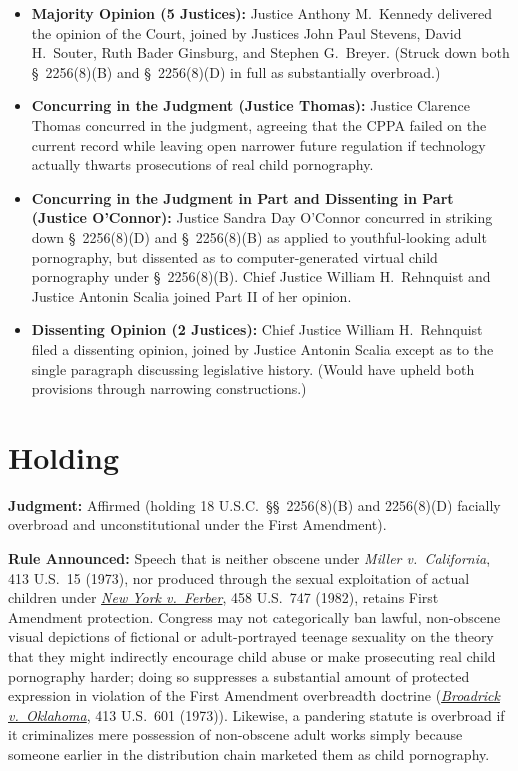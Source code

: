 \documentclass[12pt]{article}
\begin{document}
\begin{itemize}
\item \textbf{Majority Opinion (5 Justices):} Justice Anthony M.\ Kennedy delivered the opinion of the Court, joined by Justices John Paul Stevens, David H.\ Souter, Ruth Bader Ginsburg, and Stephen G.\ Breyer. (Struck down both \S~2256(8)(B) and \S~2256(8)(D) in full as substantially overbroad.)
\item \textbf{Concurring in the Judgment (Justice Thomas):} Justice Clarence Thomas concurred in the judgment, agreeing that the CPPA failed on the current record while leaving open narrower future regulation if technology actually thwarts prosecutions of real child pornography.
\item \textbf{Concurring in the Judgment in Part and Dissenting in Part (Justice O'Connor):} Justice Sandra Day O'Connor concurred in striking down \S~2256(8)(D) and \S~2256(8)(B) as applied to youthful-looking adult pornography, but dissented as to computer-generated virtual child pornography under \S~2256(8)(B). Chief Justice William H.\ Rehnquist and Justice Antonin Scalia joined Part II of her opinion.
\item \textbf{Dissenting Opinion (2 Justices):} Chief Justice William H.\ Rehnquist filed a dissenting opinion, joined by Justice Antonin Scalia except as to the single paragraph discussing legislative history. (Would have upheld both provisions through narrowing constructions.)
\end{itemize}

\section{Holding}

\textbf{Judgment:} Affirmed (holding 18 U.S.C.\ \S\S~2256(8)(B) and 2256(8)(D) facially overbroad and unconstitutional under the First Amendment).

\textbf{Rule Announced:} Speech that is neither obscene under \textit{Miller v.\ California}, 413 U.S.\ 15 (1973), nor produced through the sexual exploitation of actual children under \href{https://supreme.justia.com/cases/federal/us/458/747/}{\textit{New York v.\ Ferber}}, 458 U.S.\ 747 (1982), retains First Amendment protection. Congress may not categorically ban lawful, non-obscene visual depictions of fictional or adult-portrayed teenage sexuality on the theory that they might indirectly encourage child abuse or make prosecuting real child pornography harder; doing so suppresses a substantial amount of protected expression in violation of the First Amendment overbreadth doctrine (\href{https://supreme.justia.com/cases/federal/us/413/601/}{\textit{Broadrick v.\ Oklahoma}}, 413 U.S.\ 601 (1973)). Likewise, a pandering statute is overbroad if it criminalizes mere possession of non-obscene adult works simply because someone earlier in the distribution chain marketed them as child pornography.
\end{document}

